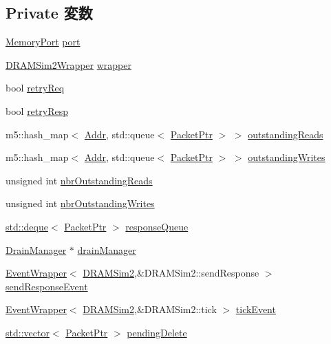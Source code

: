 \subsection*{Private 変数}
\begin{DoxyCompactItemize}
\item 
\hyperlink{classDRAMSim2_1_1MemoryPort}{MemoryPort} \hyperlink{classDRAMSim2_a55c076720c982014096b57cadebf9a14}{port}
\item 
\hyperlink{classDRAMSim2Wrapper}{DRAMSim2Wrapper} \hyperlink{classDRAMSim2_a19f45f63dee6f1b0a77c2758069683f8}{wrapper}
\item 
bool \hyperlink{classDRAMSim2_aab3b947b2633a30b5973a39b7e9b018a}{retryReq}
\item 
bool \hyperlink{classDRAMSim2_a6ddfdd4eb676d50001bda88567e6da14}{retryResp}
\item 
m5::hash\_\-map$<$ \hyperlink{base_2types_8hh_af1bb03d6a4ee096394a6749f0a169232}{Addr}, std::queue$<$ \hyperlink{classPacket}{PacketPtr} $>$ $>$ \hyperlink{classDRAMSim2_aa436e51811d19fcd65fcc5061afc981a}{outstandingReads}
\item 
m5::hash\_\-map$<$ \hyperlink{base_2types_8hh_af1bb03d6a4ee096394a6749f0a169232}{Addr}, std::queue$<$ \hyperlink{classPacket}{PacketPtr} $>$ $>$ \hyperlink{classDRAMSim2_ae3f05f6f5f0f558c32291a43c04fc1a1}{outstandingWrites}
\item 
unsigned int \hyperlink{classDRAMSim2_a75a96fd06206c4a8580628497ad694df}{nbrOutstandingReads}
\item 
unsigned int \hyperlink{classDRAMSim2_ae13aa3a1980dc05e181f85d7304baa82}{nbrOutstandingWrites}
\item 
\hyperlink{classstd_1_1deque}{std::deque}$<$ \hyperlink{classPacket}{PacketPtr} $>$ \hyperlink{classDRAMSim2_a7dd56c8ca058e3e734ec0460b1587932}{responseQueue}
\item 
\hyperlink{classDrainManager}{DrainManager} $\ast$ \hyperlink{classDRAMSim2_a329b71fb934a93312ca0aacbf5a3f982}{drainManager}
\item 
\hyperlink{classEventWrapper}{EventWrapper}$<$ \hyperlink{classDRAMSim2_1_1DRAMSim2}{DRAMSim2},\&DRAMSim2::sendResponse $>$ \hyperlink{classDRAMSim2_a46a89603d961c3ae9b2cb2df412503f6}{sendResponseEvent}
\item 
\hyperlink{classEventWrapper}{EventWrapper}$<$ \hyperlink{classDRAMSim2_1_1DRAMSim2}{DRAMSim2},\&DRAMSim2::tick $>$ \hyperlink{classDRAMSim2_acab0bec584b681055f948abbbaf8acb2}{tickEvent}
\item 
\hyperlink{classstd_1_1vector}{std::vector}$<$ \hyperlink{classPacket}{PacketPtr} $>$ \hyperlink{classDRAMSim2_a21da4bea3554874b557428e4cce5d4a4}{pendingDelete}
\end{DoxyCompactItemize}


